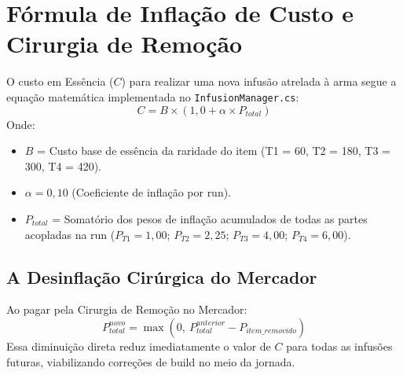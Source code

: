 \documentclass[a4paper,12pt]{report}
\begin{document}
\noindent{}

\section{Fórmula de Inflação de Custo e Cirurgia de Remoção}
O custo em Essência ($C$) para realizar uma nova infusão atrelada à arma segue a equação matemática implementada no \texttt{InfusionManager.cs}:
\[
C = B \times (1{,}0 + \alpha \times P_{total})
\]
Onde:
\begin{itemize}
    \item $B$ = Custo base de essência da raridade do item (T1 = 60, T2 = 180, T3 = 300, T4 = 420).
    \item $\alpha = 0{,}10$ (Coeficiente de inflação por run).
    \item $P_{total}$ = Somatório dos pesos de inflação acumulados de todas as partes acopladas na run ($P_{T1} = 1{,}00$; $P_{T2} = 2{,}25$; $P_{T3} = 4{,}00$; $P_{T4} = 6{,}00$).
\end{itemize}

\subsection{A Desinflação Cirúrgica do Mercador}
Ao pagar pela Cirurgia de Remoção no Mercador:
\[
P_{total}^{novo} = \max(0,\ P_{total}^{anterior} - P_{item\_removido})
\]
Essa diminuição direta reduz imediatamente o valor de $C$ para todas as infusões futuras, viabilizando correções de build no meio da jornada.

\end{document}
